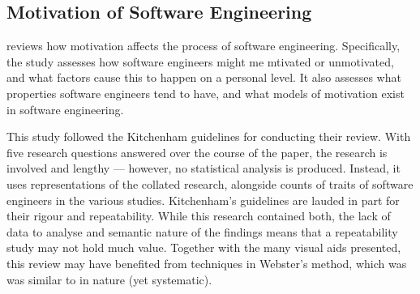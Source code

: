 \subsection{Motivation of Software Engineering} 
\citeauthor*{Beecham2007} reviews how motivation affects the process of software engineering. Specifically, the study assesses how software engineers might me mtivated or unmotivated, and what factors cause this to happen on a personal level. It also assesses what properties software engineers tend to have, and what models of motivation exist in software engineering.\par

This study followed the Kitchenham guidelines for conducting their review. With five research questions answered over the course of the paper, the research is involved and lengthy --- however, no statistical analysis is produced. Instead, it uses representations of the collated research, alongside counts of traits of software engineers in the various studies. Kitchenham's guidelines are lauded in part for their rigour and repeatability. While this research contained both, the lack of data to analyse and semantic nature of the findings means that a repeatability study may not hold much value. Together with the many visual aids presented, this review may have benefited from techniques in Webster's method, which was was similar to in nature (yet systematic).\par
